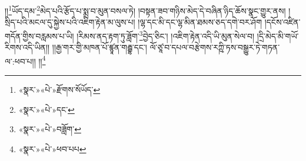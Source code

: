 །།\footnote{«སྣར་»«པེ་»རྫོགས་སོཡོད་}ཡོད་དམ་\footnote{«སྣར་»«པེ་»དང་}མེད་པའི་རྩོད་པ་སྨྲ་བ་མུན་བསལ་ཏེ། །བསྟན་ཟབ་གཉིས་མེད་དེ་བཞིན་ཉིད་ཆོས་སྣང་གྱུར་ནས། །སྲིད་པའི་མངལ་དུ་སྐྱེས་པའི་འཇིག་རྟེན་མ་ལུས་པ། །ལྷ་དང་མི་དང་ལྷ་མིན་ཐམས་ཅད་དགེ་བར་ཤོག །དངོས་འཛིན་གདོན་གྱིས་བརླམས་པ་ཡི། །རིམས་ནད་རྟག་ཏུ་ཟློག་\footnote{«སྣར་»«པེ་»བཟློག་}བྱེད་ཅིང་། །འཇིག་རྟེན་འདི་ཡི་མུན་སེལ་བ། །དྲི་མེད་མི་གཡོ་རིགས་འདི་ཡིན།། །།རྒྱ་གར་གྱི་མཁན་པོ་ཛྙཱན་གརྦྷ་དང་། ལོ་ཙཱ་བ་དཔལ་བརྩེགས་རཀྵི་ཏས་བསྒྱུར་ཏེ་གཏན་ལ་:ཕབ་པ།། །།\footnote{«སྣར་»«པེ་»ཕབ་པཔ}